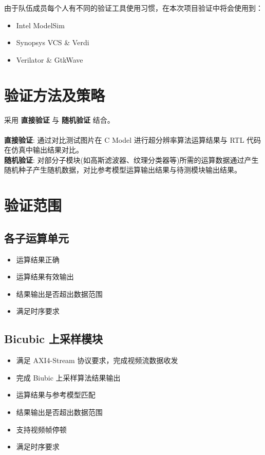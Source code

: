 \documentclass[12pt, a4paper, oneside]{ctexbook}
\begin{document}
	\par \par 由于队伍成员每个人有不同的验证工具使用习惯，在本次项目验证中将会使用到：
	\begin{itemize}
		\item Intel ModelSim
		\item Synopsys VCS \& Verdi
		\item Verilator \& GtkWave
	\end{itemize}
	\section{验证方法及策略}
	采用 \textbf{直接验证} 与 \textbf{随机验证} 结合。\\ \\
	\textbf{直接验证}: 通过对比测试图片在 C Model 进行超分辨率算法运算结果与 RTL 代码在仿真中输出结果对比。\\
	\textbf{随机验证}: 对部分子模块(如高斯滤波器、纹理分类器等)所需的运算数据通过产生随机种子产生随机数据，对比参考模型运算输出结果与待测模块输出结果。
	
	
	\section{验证范围}
	\subsection{各子运算单元}
	\begin{itemize}
		\item 运算结果正确
		\item 运算结果有效输出
		\item 结果输出是否超出数据范围
		\item 满足时序要求
	\end{itemize}
	
	\subsection{Bicubic 上采样模块}
	\begin{itemize}
		\item 满足 AXI4-Stream 协议要求，完成视频流数据收发
		\item 完成 Biubic 上采样算法结果输出
		\item 运算结果与参考模型匹配
		\item 结果输出是否超出数据范围
		\item 支持视频帧停顿
		\item 满足时序要求
	\end{itemize}
	
\end{document}

